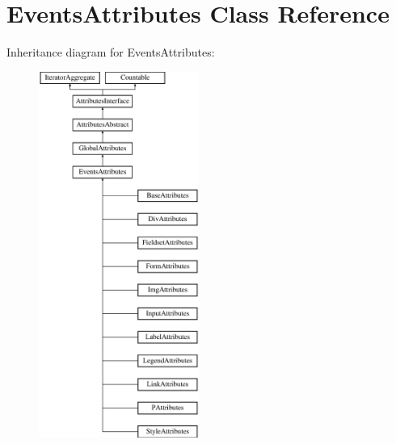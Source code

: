 \hypertarget{class_pes_1_1_dom_1_1_node_1_1_attributes_1_1_events_attributes}{}\section{Events\+Attributes Class Reference}
\label{class_pes_1_1_dom_1_1_node_1_1_attributes_1_1_events_attributes}
Inheritance diagram for Events\+Attributes\+:\begin{figure}[H]
\begin{center}
\leavevmode
\includegraphics[height=12.000000cm]{class_pes_1_1_dom_1_1_node_1_1_attributes_1_1_events_attributes}
\end{center}
\end{figure}
